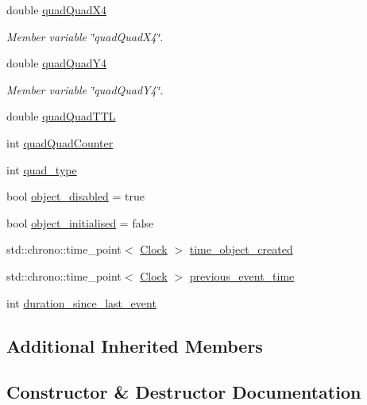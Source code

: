 \begin{DoxyCompactItemize}
double \mbox{\hyperlink{classQuad_a6bc4285074ff7259ab59293fe207af01}{quad\+Quad\+X4}}
\begin{DoxyCompactList}\small\item\em Member variable \char`\"{}quad\+Quad\+X4\char`\"{}. \end{DoxyCompactList}\item 
double \mbox{\hyperlink{classQuad_a0e7d3d2357464cbe78d73750b2399d95}{quad\+Quad\+Y4}}
\begin{DoxyCompactList}\small\item\em Member variable \char`\"{}quad\+Quad\+Y4\char`\"{}. \end{DoxyCompactList}\item 
double \mbox{\hyperlink{classQuad_aaeab0be987926009753a8d6ba0da91f3}{quad\+Quad\+T\+TL}}
\item 
int \mbox{\hyperlink{classQuad_a997f8e0e69db9b872a79566225686535}{quad\+Quad\+Counter}}
\item 
int \mbox{\hyperlink{classQuad_a57fab7c05edae3fcc29ab4e9aad3fadf}{quad\+\_\+type}}
\item 
bool \mbox{\hyperlink{classQuad_a5c2d3f68a2e9635ef429696dc6ea85a4}{object\+\_\+disabled}} = true
\item 
bool \mbox{\hyperlink{classQuad_a3c86ec7d962acd1e478ed55095970b1d}{object\+\_\+initialised}} = false
\item 
std\+::chrono\+::time\+\_\+point$<$ \mbox{\hyperlink{universe_8h_a0ef8d951d1ca5ab3cfaf7ab4c7a6fd80}{Clock}} $>$ \mbox{\hyperlink{classQuad_a5779e2e09362b665bccd2ae4e29602ff}{time\+\_\+object\+\_\+created}}
\item 
std\+::chrono\+::time\+\_\+point$<$ \mbox{\hyperlink{universe_8h_a0ef8d951d1ca5ab3cfaf7ab4c7a6fd80}{Clock}} $>$ \mbox{\hyperlink{classQuad_a949879597ab1df686b85faef577c9081}{previous\+\_\+event\+\_\+time}}
\item 
int \mbox{\hyperlink{classQuad_a2b51c548a5ede0a340374c6ce9093cd5}{duration\+\_\+since\+\_\+last\+\_\+event}}
\end{DoxyCompactItemize}
\subsection*{Additional Inherited Members}


\subsection{Constructor \& Destructor Documentation}
\mbox{\label{classQuad_ae446d188d645cc5c512336f25d1a697a}} 
